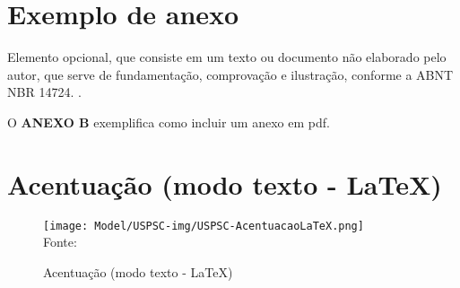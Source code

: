 \begin{anexosenv}

\partanexos

\chapter{Exemplo de anexo}
Elemento opcional, que consiste em um texto ou documento não elaborado pelo autor, que serve de fundamentação, comprovação e ilustração, conforme a ABNT NBR 14724. \cite{nbr14724}.

O \textbf{ANEXO B} exemplifica como incluir um anexo em pdf.

\chapter{Acentuação (modo texto - \LaTeX)}
\begin{figure}[H]
	\begin{center}
	\caption{\label{fig_anexob}Acentuação (modo texto - \LaTeX)}
	\texttt{[image: Model/USPSC-img/USPSC-AcentuacaoLaTeX.png]} \\
	Fonte: 
	\end{center}	
\end{figure}

\end{anexosenv}
